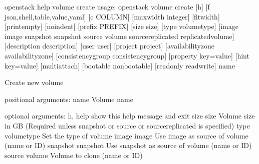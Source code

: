 \documentclass[letterpaper,10pt,english]{sphinxmanual}
\begin{document}
\begin{sphinxVerbatim}[commandchars=\\\{\}]
\PYGZdl{} openstack help volume create
usage: openstack volume create [\PYGZhy{}h] [\PYGZhy{}f \PYGZob{}json,shell,table,value,yaml\PYGZcb{}]
                               [\PYGZhy{}c COLUMN] [\PYGZhy{}\PYGZhy{}max\PYGZhy{}width \PYGZlt{}integer\PYGZgt{}]
                               [\PYGZhy{}\PYGZhy{}fit\PYGZhy{}width] [\PYGZhy{}\PYGZhy{}print\PYGZhy{}empty] [\PYGZhy{}\PYGZhy{}noindent]
                               [\PYGZhy{}\PYGZhy{}prefix PREFIX] [\PYGZhy{}\PYGZhy{}size \PYGZlt{}size\PYGZgt{}]
                               [\PYGZhy{}\PYGZhy{}type \PYGZlt{}volume\PYGZhy{}type\PYGZgt{}]
                               [\PYGZhy{}\PYGZhy{}image \PYGZlt{}image\PYGZgt{} \textbar{} \PYGZhy{}\PYGZhy{}snapshot \PYGZlt{}snapshot\PYGZgt{} \textbar{} \PYGZhy{}\PYGZhy{}source \PYGZlt{}volume\PYGZgt{} \textbar{} \PYGZhy{}\PYGZhy{}source\PYGZhy{}replicated \PYGZlt{}replicated\PYGZhy{}volume\PYGZgt{}]
                               [\PYGZhy{}\PYGZhy{}description \PYGZlt{}description\PYGZgt{}] [\PYGZhy{}\PYGZhy{}user \PYGZlt{}user\PYGZgt{}]
                               [\PYGZhy{}\PYGZhy{}project \PYGZlt{}project\PYGZgt{}]
                               [\PYGZhy{}\PYGZhy{}availability\PYGZhy{}zone \PYGZlt{}availability\PYGZhy{}zone\PYGZgt{}]
                               [\PYGZhy{}\PYGZhy{}consistency\PYGZhy{}group consistency\PYGZhy{}group\PYGZgt{}]
                               [\PYGZhy{}\PYGZhy{}property \PYGZlt{}key=value\PYGZgt{}] [\PYGZhy{}\PYGZhy{}hint \PYGZlt{}key=value\PYGZgt{}]
                               [\PYGZhy{}\PYGZhy{}multi\PYGZhy{}attach] [\PYGZhy{}\PYGZhy{}bootable \textbar{} \PYGZhy{}\PYGZhy{}non\PYGZhy{}bootable]
                               [\PYGZhy{}\PYGZhy{}read\PYGZhy{}only \textbar{} \PYGZhy{}\PYGZhy{}read\PYGZhy{}write]
                               \PYGZlt{}name\PYGZgt{}


Create new volume

positional arguments:
  \PYGZlt{}name\PYGZgt{}                Volume name

optional arguments:
  \PYGZhy{}h, \PYGZhy{}\PYGZhy{}help            show this help message and exit
  \PYGZhy{}\PYGZhy{}size \PYGZlt{}size\PYGZgt{}         Volume size in GB (Required unless \PYGZhy{}\PYGZhy{}snapshot or
                        \PYGZhy{}\PYGZhy{}source or \PYGZhy{}\PYGZhy{}source\PYGZhy{}replicated is specified)
  \PYGZhy{}\PYGZhy{}type \PYGZlt{}volume\PYGZhy{}type\PYGZgt{}  Set the type of volume
  \PYGZhy{}\PYGZhy{}image \PYGZlt{}image\PYGZgt{}       Use \PYGZlt{}image\PYGZgt{} as source of volume (name or ID)
  \PYGZhy{}\PYGZhy{}snapshot \PYGZlt{}snapshot\PYGZgt{}
                        Use \PYGZlt{}snapshot\PYGZgt{} as source of volume (name or ID)
  \PYGZhy{}\PYGZhy{}source \PYGZlt{}volume\PYGZgt{}     Volume to clone (name or ID)
\end{sphinxVerbatim}
\end{document}
